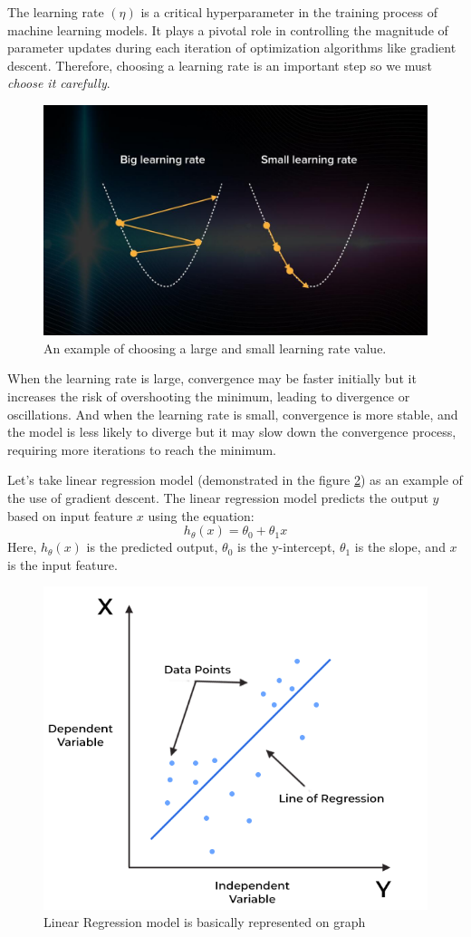 \documentclass[12pt,a4paper]{article}
\begin{document}
The learning rate $(\eta)$ is a critical hyperparameter in the training process of machine learning models. It plays a pivotal role in controlling the magnitude of parameter updates during each iteration of optimization algorithms like gradient descent. Therefore, choosing a learning rate is an important step so we must \textit{choose it carefully}.


\begin{figure}[htb]
	\centering
	\includegraphics[width=0.7\linewidth]{assets/learning_rate}
	\caption{An example of choosing a large and small learning rate value.}
	\label{fig:learningrate}
\end{figure}


When the learning rate is large, convergence may be faster initially but it increases the risk of overshooting the minimum, leading to divergence or oscillations. And when the learning rate is small, convergence is more stable, and the model is less likely to diverge but it may slow down the convergence process, requiring more iterations to reach the minimum.

Let's take linear regression model (demonstrated in the figure \ref{fig:linearregression}) as an example of the use of gradient descent. The linear regression model predicts the output $y$ based on input feature $x$ using the equation:
\begin{equation}
	h_\theta(x) = \theta_0 + \theta_1 x
\end{equation}
Here, $h_\theta(x)$ is the predicted output, $\theta_0$ is the y-intercept, $\theta_1$ is the slope, and $x$ is the input feature.

\begin{figure}
	\centering
	\includegraphics[width=0.5\linewidth]{assets/linear_regression}
	\caption{Linear Regression model is basically represented on graph}
	\label{fig:linearregression}
\end{figure}
\end{document}
